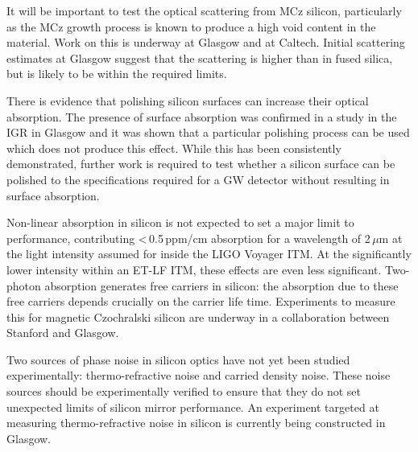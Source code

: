 It will be important to test the optical scattering from MCz silicon, particularly as the MCz growth process is known to produce a high void content in the material. Work on this is underway at Glasgow and at Caltech. Initial scattering estimates at Glasgow suggest that the scattering is higher than in fused silica, but is likely to be within the required limits.

There is evidence that polishing silicon surfaces can increase their optical absorption. The presence of surface absorption was confirmed in a study in the IGR in Glasgow  and it was shown that a particular polishing process can be used which does not produce this effect. While this has been consistently demonstrated, further work is required to test whether a silicon surface can be polished to the specifications required for a GW detector without resulting in surface absorption.

Non-linear absorption in silicon is not expected to set a major limit to performance, contributing <\,0.5\,ppm/cm absorption for a wavelength of 2\,$\mu$m at the light intensity assumed for inside the LIGO Voyager ITM. At the significantly lower intensity within an ET-LF ITM, these effects are even less significant. Two-photon absorption generates free carriers in silicon: the absorption due to these free carriers depends crucially on the carrier life time. Experiments to measure this for magnetic Czochralski silicon are underway in a collaboration between Stanford and Glasgow.

Two sources of phase noise in silicon optics have not yet been studied experimentally: thermo-refractive noise and carried density noise. These noise sources should be experimentally verified to ensure that they do not set unexpected limits of silicon mirror performance. An experiment targeted at measuring thermo-refractive noise in silicon is currently being constructed in Glasgow.


